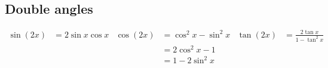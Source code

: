 \subsection*{Double angles}

\begin{align*}
  \sin(2x)  &= 2 \sin x \cos x
  &\cos(2x)  &= \cos^2 x - \sin^2 x
  &\tan(2x)  &= \frac{2 \tan x}{1 - \tan^2 x}\\
            &&&= 2 \cos^2 x - 1\\
            &&&= 1 - 2 \sin^2 x
\end{align*}
